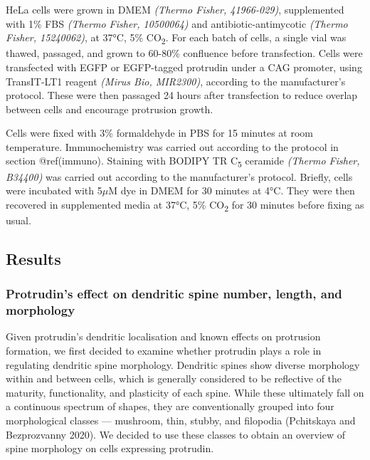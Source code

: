 \documentclass[
]{article}
\begin{document}
HeLa cells were grown in DMEM \emph{(Thermo Fisher, 41966-029)},
supplemented with 1\% FBS \emph{(Thermo Fisher, 10500064)} and
antibiotic-antimycotic \emph{(Thermo Fisher, 15240062)}, at 37°C, 5\%
CO\textsubscript{2}. For each batch of cells, a single vial was thawed,
passaged, and grown to 60-80\% confluence before transfection. Cells
were transfected with EGFP or EGFP-tagged protrudin under a CAG
promoter, using TransIT-LT1 reagent \emph{(Mirus Bio, MIR2300)},
according to the manufacturer's protocol. These were then passaged 24
hours after transfection to reduce overlap between cells and encourage
protrusion growth.

Cells were fixed with 3\% formaldehyde in PBS for 15 minutes at room
temperature. Immunochemistry was carried out according to the protocol
in section @ref(immuno). Staining with BODIPY TR C\textsubscript{5}
ceramide \emph{(Thermo Fisher, B34400)} was carried out according to the
manufacturer's protocol. Briefly, cells were incubated with 5\(\mu\)M
dye in DMEM for 30 minutes at 4°C. They were then recovered in
supplemented media at 37°C, 5\% CO\textsubscript{2} for 30 minutes
before fixing as usual.

\hypertarget{results}{%
\subsection{Results}\label{results}}

\hypertarget{protrudins-effect-on-dendritic-spine-number-length-and-morphology}{%
\subsubsection{Protrudin's effect on dendritic spine number, length, and
morphology}\label{protrudins-effect-on-dendritic-spine-number-length-and-morphology}}

Given protrudin's dendritic localisation and known effects on protrusion
formation, we first decided to examine whether protrudin plays a role in
regulating dendritic spine morphology. Dendritic spines show diverse
morphology within and between cells, which is generally considered to be
reflective of the maturity, functionality, and plasticity of each spine.
While these ultimately fall on a continuous spectrum of shapes, they are
conventionally grouped into four morphological classes --- mushroom,
thin, stubby, and filopodia (Pchitskaya and Bezprozvanny 2020). We
decided to use these classes to obtain an overview of spine morphology
on cells expressing protrudin.
\end{document}
